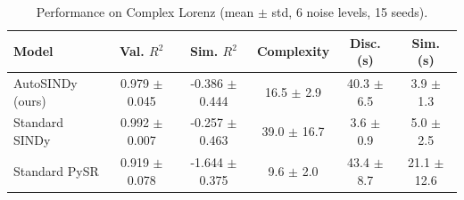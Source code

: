 \begin{table}[htbp]
\centering
\small
\renewcommand{\arraystretch}{1.2}
\caption{Performance on Complex Lorenz (mean $\pm$ std, 6 noise levels, 15 seeds).}
\label{tab:autosindy_complex_lorenz}
\begin{tabular}{lccccc}
\toprule
Model & Val. $R^2$ & Sim. $R^2$ & Complexity & Disc. (s) & Sim. (s) \\
\midrule
AutoSINDy (ours) & 0.979 $\pm$ 0.045 & -0.386 $\pm$ 0.444 & 16.5 $\pm$ 2.9 & 40.3 $\pm$ 6.5 & 3.9 $\pm$ 1.3 \\
Standard SINDy & 0.992 $\pm$ 0.007 & -0.257 $\pm$ 0.463 & 39.0 $\pm$ 16.7 & 3.6 $\pm$ 0.9 & 5.0 $\pm$ 2.5 \\
Standard PySR & 0.919 $\pm$ 0.078 & -1.644 $\pm$ 0.375 & 9.6 $\pm$ 2.0 & 43.4 $\pm$ 8.7 & 21.1 $\pm$ 12.6 \\
\bottomrule
\end{tabular}
\end{table}